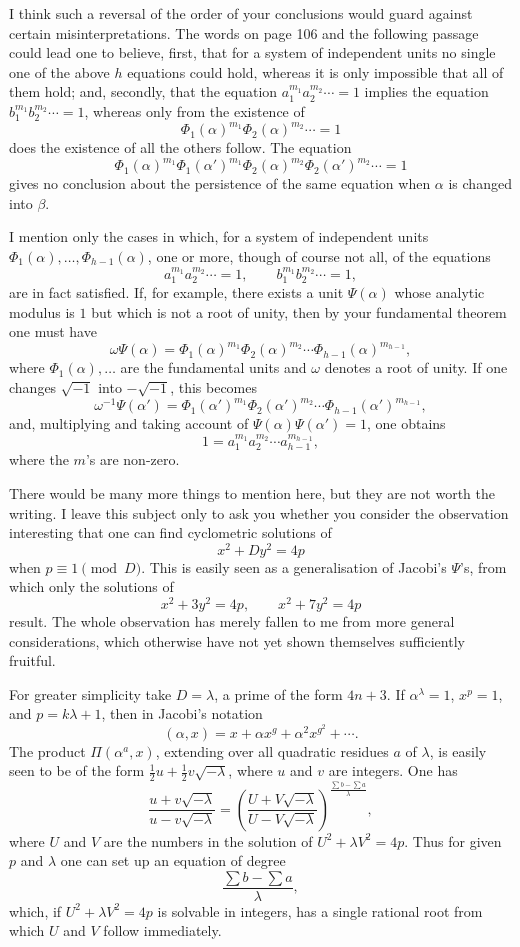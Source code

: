 \documentclass[11pt]{article}
\begin{document}
I think such a reversal of the order of your conclusions would guard against certain misinterpretations. The words on page 106 and the following passage could lead one to believe, first, that for a system of independent units no single one of the above $h$ equations could hold, whereas it is only impossible that all of them hold; and, secondly, that the equation $a_1^{m_1}a_2^{m_2}\cdots=1$ implies the equation $b_1^{m_1}b_2^{m_2}\cdots=1$, whereas only from the existence of
\[
  \Phi_1(\alpha)^{m_1}\Phi_2(\alpha)^{m_2}\cdots=1
\]
does the existence of all the others follow. The equation
\[
  \Phi_1(\alpha)^{m_1}\Phi_1(\alpha')^{m_1}
  \Phi_2(\alpha)^{m_2}\Phi_2(\alpha')^{m_2}\cdots=1
\]
gives no conclusion about the persistence of the same equation when $\alpha$ is changed into $\beta$.

I mention only the cases in which, for a system of independent units $\Phi_1(\alpha),\ldots,\Phi_{h-1}(\alpha)$, one or more, though of course not all, of the equations
\[
  a_1^{m_1}a_2^{m_2}\cdots=1,\qquad
  b_1^{m_1}b_2^{m_2}\cdots=1,
\]
are in fact satisfied. If, for example, there exists a unit $\Psi(\alpha)$ whose analytic modulus is $1$ but which is not a root of unity, then by your fundamental theorem one must have
\[
  \omega\Psi(\alpha)=
  \Phi_1(\alpha)^{m_1}\Phi_2(\alpha)^{m_2}\cdots\Phi_{h-1}(\alpha)^{m_{h-1}},
\]
where $\Phi_1(\alpha),\ldots$ are the fundamental units and $\omega$ denotes a root of unity. If one changes $\sqrt{-1}$ into $-\sqrt{-1}$, this becomes
\[
  \omega^{-1}\Psi(\alpha')=
  \Phi_1(\alpha')^{m_1}\Phi_2(\alpha')^{m_2}\cdots\Phi_{h-1}(\alpha')^{m_{h-1}},
\]
and, multiplying and taking account of $\Psi(\alpha)\Psi(\alpha')=1$, one obtains
\[
  1=a_1^{m_1}a_2^{m_2}\cdots a_{h-1}^{m_{h-1}},
\]
where the $m$'s are non-zero.

There would be many more things to mention here, but they are not worth the writing. I leave this subject only to ask you whether you consider the observation interesting that one can find cyclometric solutions of
\[
  x^2+Dy^2=4p
\]
when $p\equiv1\pmod D$. This is easily seen as a generalisation of Jacobi's $\Psi$'s, from which only the solutions of
\[
  x^2+3y^2=4p,
  \qquad
  x^2+7y^2=4p
\]
result. The whole observation has merely fallen to me from more general considerations, which otherwise have not yet shown themselves sufficiently fruitful.

For greater simplicity take $D=\lambda$, a prime of the form $4n+3$. If $\alpha^\lambda=1$, $x^p=1$, and $p=k\lambda+1$, then in Jacobi's notation
\[
  (\alpha,x)=x+\alpha x^g+\alpha^2x^{g^2}+\cdots.
\]
The product $\Pi(\alpha^a,x)$, extending over all quadratic residues $a$ of $\lambda$, is easily seen to be of the form $\tfrac12u+\tfrac12v\sqrt{-\lambda}$, where $u$ and $v$ are integers. One has
\[
  \frac{u+v\sqrt{-\lambda}}{u-v\sqrt{-\lambda}}
  =
  \left(\frac{U+V\sqrt{-\lambda}}{U-V\sqrt{-\lambda}}\right)^{\frac{\sum b-\sum a}{\lambda}},
\]
where $U$ and $V$ are the numbers in the solution of $U^2+\lambda V^2=4p$. Thus for given $p$ and $\lambda$ one can set up an equation of degree
\[
  \frac{\sum b-\sum a}{\lambda},
\]
which, if $U^2+\lambda V^2=4p$ is solvable in integers, has a single rational root from which $U$ and $V$ follow immediately.
\end{document}
